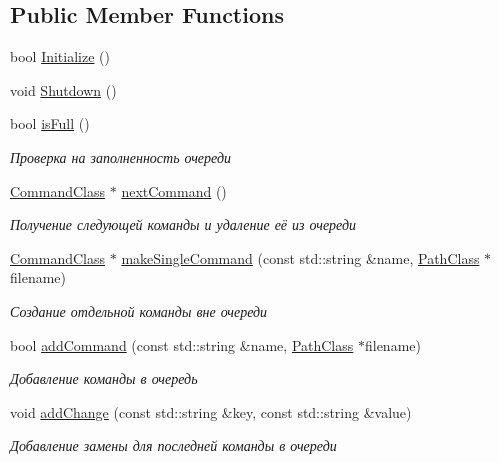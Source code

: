 \subsection*{Public Member Functions}
\begin{DoxyCompactItemize}
\item 
bool \hyperlink{class_command_manager_class_a286552bb41459dd75197df2287e2b6b8}{Initialize} ()
\item 
void \hyperlink{class_command_manager_class_a5c111abbf6138d3abd5bd6d1713baa85}{Shutdown} ()
\item 
bool \hyperlink{class_command_manager_class_abaae2d41564e3942d092212e2983c95d}{is\+Full} ()
\begin{DoxyCompactList}\small\item\em Проверка на заполненность очереди \end{DoxyCompactList}\item 
\hyperlink{class_command_class}{Command\+Class} $\ast$ \hyperlink{class_command_manager_class_a73d1fd9793d205a71c68ad50b8a76814}{next\+Command} ()
\begin{DoxyCompactList}\small\item\em Получение следующей команды и удаление её из очереди \end{DoxyCompactList}\item 
\hyperlink{class_command_class}{Command\+Class} $\ast$ \hyperlink{class_command_manager_class_ad6ae476b111ffdb1a55aee67d3ff0b1f}{make\+Single\+Command} (const std\+::string \&name, \hyperlink{class_path_class}{Path\+Class} $\ast$filename)
\begin{DoxyCompactList}\small\item\em Создание отдельной команды вне очереди \end{DoxyCompactList}\item 
bool \hyperlink{class_command_manager_class_a2dce2718882763449878d2db5edaf838}{add\+Command} (const std\+::string \&name, \hyperlink{class_path_class}{Path\+Class} $\ast$filename)
\begin{DoxyCompactList}\small\item\em Добавление команды в очередь \end{DoxyCompactList}\item 
void \hyperlink{class_command_manager_class_aaf4d2ab9f675fb6dc47e1ac8e14aa584}{add\+Change} (const std\+::string \&key, const std\+::string \&value)
\begin{DoxyCompactList}\small\item\em Добавление замены для последней команды в очереди \end{DoxyCompactList}\item 

\end{DoxyCompactItemize}

